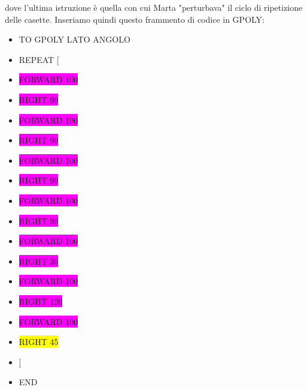dove l'ultima istruzione è quella con cui Marta "perturbava" il ciclo di ripetizione delle casette.
Inseriamo quindi questo frammento di codice in GPOLY:


\vskip 1cm

\begin{minipage}{1.0\textwidth}
\begin{itemize}[itemsep=-3pt,parsep=2pt]
\item[] TO GPOLY LATO ANGOLO 
\item[] \hspace{8pt}    REPEAT [
	\item[] \hspace{0.65cm} \colorbox{magenta}{FORWARD 100}
	\item[] \hspace{0.65cm} \colorbox{magenta}{RIGHT 90}
	\item[] \hspace{0.65cm} \colorbox{magenta}{FORWARD 100}
	\item[] \hspace{0.65cm} \colorbox{magenta}{RIGHT 90}
	\item[] \hspace{0.65cm} \colorbox{magenta}{FORWARD 100}
	\item[] \hspace{0.65cm} \colorbox{magenta}{RIGHT 90}
	\item[] \hspace{0.65cm} \colorbox{magenta}{FORWARD 100}
	\item[] \hspace{0.65cm} \colorbox{magenta}{RIGHT 90}
	\item[] \hspace{0.65cm} \colorbox{magenta}{FORWARD 100}
	\item[] \hspace{0.65cm} \colorbox{magenta}{RIGHT 30}
	\item[] \hspace{0.65cm} \colorbox{magenta}{FORWARD 100}
	\item[] \hspace{0.65cm} \colorbox{magenta}{RIGHT 120}
	\item[] \hspace{0.65cm} \colorbox{magenta}{FORWARD 100}
	\item[] \hspace{0.65cm} \colorbox{yellow}{RIGHT 45}
\item[] \hspace{8pt}   ]
\item[] END
\end{itemize}          	          
\end{minipage}

